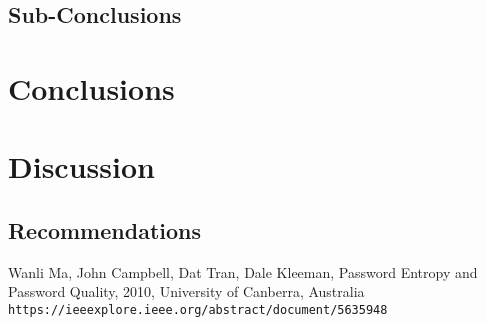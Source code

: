 \documentclass[a4paper,12pt]{article}
\begin{document}
\subsection{Sub-Conclusions}

\newpage
\section{Conclusions}

\newpage
\section{Discussion}

\newpage
\subsection{Recommendations}

\newpage
\begin{thebibliography}{9}
   Wanli Ma, John Campbell, Dat Tran, Dale Kleeman, Password Entropy and Password Quality, 2010, University of Canberra, Australia \texttt{https://ieeexplore.ieee.org/abstract/document/5635948}
\end{thebibliography}
\end{document}
